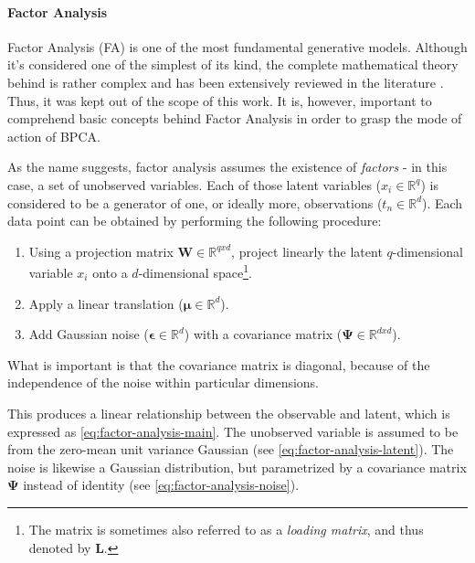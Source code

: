 \paragraph{Factor Analysis}\label{par:factor-analysis}
Factor Analysis (FA) is one of the most fundamental generative models. Although it's considered one of the simplest of its kind, the complete mathematical theory behind is rather complex and has been extensively reviewed in the literature \cite{Fruchter1954}\cite{Harman1976}\cite{Child1990}. Thus, it was kept out of the scope of this work. It is, however, important to comprehend basic concepts behind Factor Analysis in order to grasp the mode of action of BPCA.

\vspace{\baselineskip} 
As the name suggests, factor analysis assumes the existence of \textit{factors} - in this case, a set of unobserved variables. Each of those latent variables ($x_i \in \mathbb{R}^q$) is considered to be a generator of one, or ideally more, observations ($t_n \in \mathbb{R}^d$). Each data point can be obtained by performing the following procedure:
\begin{enumerate}
    \item Using a projection matrix $\mathbf{W} \in \mathbb{R}^{qxd}$, project linearly the latent $q$-dimensional variable $x_i$ onto a $d$-dimensional space\footnote{The matrix is sometimes also referred to as a \textit{loading matrix}, and thus denoted by $\mathbf{L}$.}.
    \item Apply a linear translation  ($\boldsymbol{\mu} \in \mathbb{R}^{d}$).
    \item Add Gaussian noise ($\boldsymbol{\epsilon} \in \mathbb{R}^{d}$) with a covariance matrix ($\mathbf{\Psi} \in \mathbb{R}^{dxd}$).
\end{enumerate}

What is important is that the covariance matrix is diagonal, because of the independence of the noise within particular dimensions.

\vspace{\baselineskip}
This produces a linear relationship between the observable and latent, which is expressed as \autoref{eq:factor-analysis-main}. The unobserved variable is assumed to be from the zero-mean unit variance Gaussian (see \autoref{eq:factor-analysis-latent}). The noise is likewise a Gaussian distribution, but parametrized by a covariance matrix $\mathbf{\Psi}$ instead of identity (see \autoref{eq:factor-analysis-noise}).

